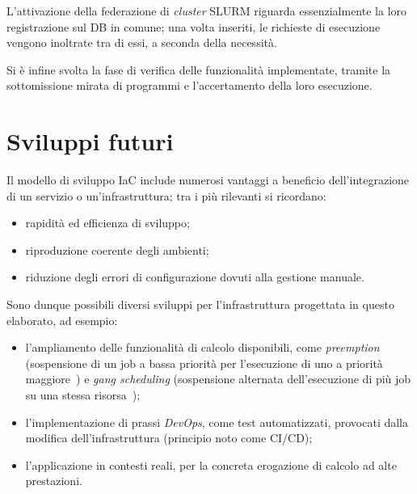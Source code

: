 \documentclass[12pt,a4paper,twoside,openright]{book}
\begin{document}
L'attivazione della federazione di \textit{cluster} \ac{SLURM} riguarda essenzialmente la loro registrazione sul \ac{DB} in comune; una volta inseriti, le richieste di esecuzione vengono inoltrate tra di essi, a seconda della necessità.

Si è infine svolta la fase di verifica delle funzionalità implementate, tramite la sottomissione mirata di programmi e l'accertamento della loro esecuzione.

\section{Sviluppi futuri}
Il modello di sviluppo \ac{IaC} include numerosi vantaggi a beneficio dell'integrazione di un servizio o un'infrastruttura; tra i più rilevanti si ricordano:
\begin{itemize}
    \item rapidità ed efficienza di sviluppo;
    \item riproduzione coerente degli ambienti;
    \item riduzione degli errori di configurazione dovuti alla gestione manuale.
\end{itemize}
Sono dunque possibili diversi sviluppi per l'infrastruttura progettata in questo elaborato, ad esempio:
\begin{itemize}
    \item l'ampliamento delle funzionalità di calcolo disponibili, come \textit{preemption} (sospensione di un job a bassa priorità per l'esecuzione di uno a priorità maggiore~\cite{slurmpreemption}) e \textit{gang scheduling} (sospensione alternata dell'esecuzione di più job su una stessa risorsa~\cite{slurmgang});
    \item l'implementazione di prassi \textit{DevOps}, come test automatizzati, provocati dalla modifica dell'infrastruttura (principio noto come \acf{CI/CD});
    \item l'applicazione in contesti reali, per la concreta erogazione di calcolo ad alte prestazioni.
\end{itemize}


\newpage \thispagestyle{empty} \ \newpage %
\printbibliography[heading=bibintoc]
\end{document}
